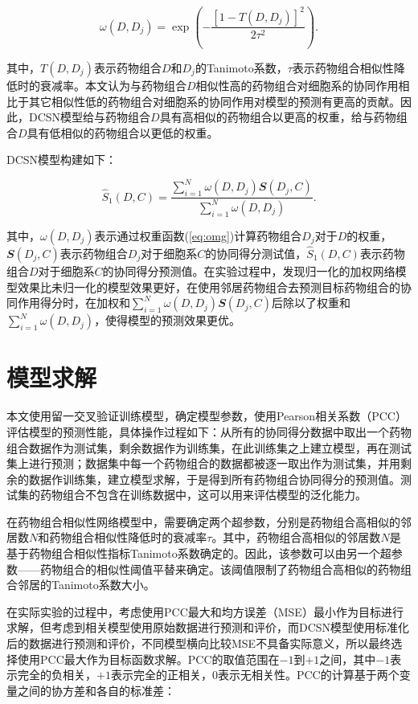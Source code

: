 \begin{equation}
\omega(D,D_j)=\exp\left(-\frac{[1-T(D,D_j)]^2}{2\tau^2}\right).
\label{eq:omg}
\end{equation}

\noindent 其中，$T(D,D_j)$表示药物组合$D$和$D_j$的Tanimoto系数，$τ$表示药物组合相似性降低时的衰减率。本文认为与药物组合$D$相似性高的药物组合对细胞系的协同作用相比于其它相似性低的药物组合对细胞系的协同作用对模型的预测有更高的贡献。因此，DCSN模型给与药物组合$D$具有高相似的药物组合以更高的权重，给与药物组合$D$具有低相似的药物组合以更低的权重。

DCSN模型构建如下：

\begin{equation}
\hat{S}_1(D,C) = \frac{\sum\limits_{i=1}^N \omega(D,D_j) \mathbfit{S}(D_j,C)}{\sum\limits_{i=1}^N \omega(D,D_j)}.
\end{equation}

\noindent 其中，$ω(D,D_j)$表示通过权重函数(\ref{eq:omg})计算药物组合$D_j$对于$D$的权重，$\mathbfit{S}(D_j,C)$表示药物组合$D_j$对于细胞系$C$的协同得分测试值，$\hat{S}_1(D,C)$表示药物组合$D$对于细胞系$C$的协同得分预测值。在实验过程中，发现归一化的加权网络模型效果比未归一化的模型效果更好，在使用邻居药物组合去预测目标药物组合的协同作用得分时，在加权和${\sum\limits_{i=1}^N \omega(D,D_j) \mathbfit{S}(D_j,C)}$后除以了权重和${\sum\limits_{i=1}^N \omega(D,D_j)}$，使得模型的预测效果更优。

\section{模型求解}

本文使用留一交叉验证\cite{25}训练模型，确定模型参数，使用Pearson相关系数（PCC）评估模型的预测性能，具体操作过程如下：从所有的协同得分数据中取出一个药物组合数据作为测试集，剩余数据作为训练集，在此训练集之上建立模型，再在测试集上进行预测；数据集中每一个药物组合的数据都被逐一取出作为测试集，并用剩余的数据作训练集，建立模型求解，于是得到所有药物组合协同得分的预测值。测试集的药物组合不包含在训练数据中，这可以用来评估模型的泛化能力。

在药物组合相似性网络模型中，需要确定两个超参数，分别是药物组合高相似的邻居数$N$和药物组合相似性降低时的衰减率$τ$。其中，药物组合高相似的邻居数$N$是基于药物组合相似性指标Tanimoto系数确定的。因此，该参数可以由另一个超参数——药物组合的相似性阈值平替来确定。该阈值限制了药物组合高相似的药物组合邻居的Tanimoto系数大小。

在实际实验的过程中，考虑使用PCC最大和均方误差（MSE）最小作为目标进行求解，但考虑到相关模型使用原始数据进行预测和评价，而DCSN模型使用标准化后的数据进行预测和评价，不同模型横向比较MSE不具备实际意义，所以最终选择使用PCC最大作为目标函数求解。PCC的取值范围在$-1$到$+1$之间，其中$-1$表示完全的负相关，$+1$表示完全的正相关，$0$表示无相关性。PCC的计算基于两个变量之间的协方差和各自的标准差：

